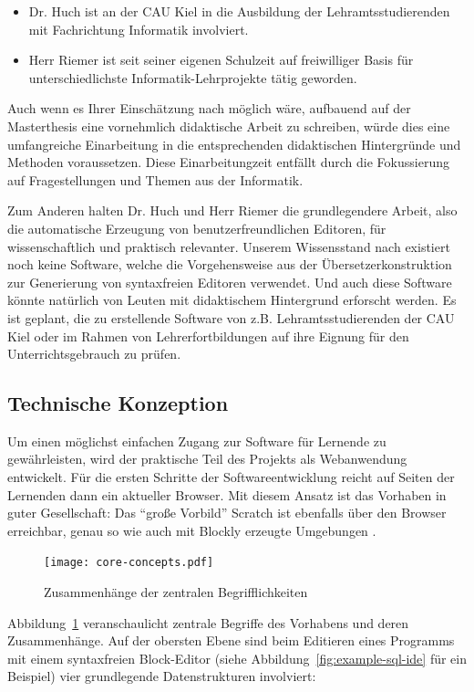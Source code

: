 \documentclass[paper=a4,fontsize=12pt,parskip=half]{scrartcl}
\begin{document}
\begin{itemize}
\item Dr. Huch ist an der CAU Kiel in die Ausbildung der Lehramtsstudierenden mit Fachrichtung Informatik involviert.
\item Herr Riemer ist seit seiner eigenen Schulzeit auf freiwilliger Basis für unterschiedlichste Informatik-Lehrprojekte tätig geworden.
\end{itemize}

Auch wenn es Ihrer Einschätzung nach möglich wäre, aufbauend auf der Masterthesis eine vornehmlich didaktische Arbeit zu schreiben, würde dies eine umfangreiche Einarbeitung in die entsprechenden didaktischen Hintergründe und Methoden voraussetzen. Diese Einarbeitungzeit entfällt durch die Fokussierung auf Fragestellungen und Themen aus der Informatik.

Zum Anderen halten Dr. Huch und Herr Riemer die grundlegendere Arbeit, also die automatische Erzeugung von benutzerfreundlichen Editoren, für wissenschaftlich und praktisch relevanter. Unserem Wissensstand nach existiert noch keine Software, welche die Vorgehensweise aus der Übersetzerkonstruktion zur Generierung von syntaxfreien Editoren verwendet. Und auch diese Software könnte natürlich von Leuten mit didaktischem Hintergrund erforscht werden. Es ist geplant, die zu erstellende Software von z.B. Lehramtsstudierenden der CAU Kiel oder im Rahmen von Lehrerfortbildungen auf ihre Eignung für den Unterrichtsgebrauch zu prüfen.

\subsection{Technische Konzeption}

Um einen möglichst einfachen Zugang zur Software für Lernende zu gewährleisten, wird der praktische Teil des Projekts als Webanwendung entwickelt. Für die ersten Schritte der Softwareentwicklung reicht auf Seiten der Lernenden dann ein aktueller Browser. Mit diesem Ansatz ist das Vorhaben in guter Gesellschaft: Das \enquote{große Vorbild} Scratch ist ebenfalls über den Browser erreichbar, genau so wie auch mit Blockly erzeugte Umgebungen \cite[vgl. S. 28]{riemer_blattwerkzeug_2016}.

\begin{figure}
  \texttt{[image: core-concepts.pdf]}
  \caption{Zusammenhänge der zentralen Begrifflichkeiten}
  \label{fig:core-relations}
\end{figure}

Abbildung~\ref{fig:core-relations} veranschaulicht zentrale Begriffe des Vorhabens und deren Zusammenhänge. Auf der obersten Ebene sind beim Editieren eines Programms mit einem syntaxfreien Block-Editor (siehe Abbildung~\ref{fig:example-sql-ide} für ein Beispiel) vier grundlegende Datenstrukturen involviert:
\end{document}
